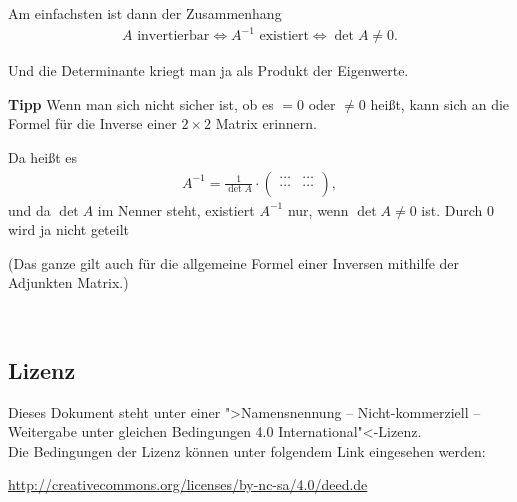 \documentclass[11pt, a4paper]{article}
\begin{document}
\begin{itemize}
Am einfachsten ist dann der Zusammenhang 
\begin{align*}
A \text{~invertierbar} \Leftrightarrow A^{-1} \text{~existiert} \Leftrightarrow \det A \neq 0.
\end{align*}

Und die Determinante kriegt man ja als Produkt der Eigenwerte. 

\textbf{Tipp} Wenn man sich nicht sicher ist, ob es $= 0$ oder $\neq 0$ heißt, kann sich an die Formel für die Inverse einer $2 \times 2$ Matrix erinnern.

Da heißt es
\begin{align*}
A^{-1} = \frac{1}{\det A} \cdot \left(
\begin{array}{cc}
\dots & \dots\\ 
\dots & \dots\\
\end{array}
\right),
\end{align*}
und da $\det A$ im Nenner steht, existiert $A^{-1}$ nur, wenn $\det A \neq 0$ ist. Durch $0$ wird ja nicht geteilt \smiley{}

(Das ganze gilt auch für die allgemeine Formel einer Inversen mithilfe der Adjunkten Matrix.)
\end{itemize}




\newpage
~
\vfill
{\footnotesize
\subsection*{Lizenz}
Dieses Dokument steht unter einer ">Namensnennung -- Nicht-kommerziell -- Weitergabe unter gleichen Bedingungen 4.0 International"<-Lizenz.\\

\noindent
Die Bedingungen der Lizenz können unter folgendem Link eingesehen werden: 

\noindent
\url{http://creativecommons.org/licenses/by-nc-sa/4.0/deed.de}}
\end{document}
